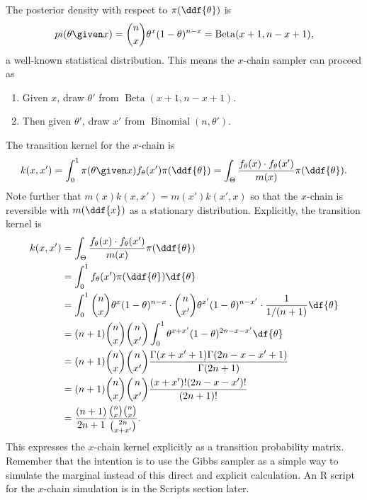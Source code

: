 \documentclass[12pt]{article}
\begin{document}
The posterior density with respect to \( \pi(\ddf{\theta}) \) is
\[
    \\
    pi(\theta \given x) = \binom{n}{x}\theta^x(1-\theta)^{n-x} =
    \operatorname{Beta}
    (x+1, n-x+1),
\] a well-known statistical distribution.  This means the \( x \)-chain
sampler can proceed as
\begin{enumerate}
    \item
        Given \( x \), draw \( \theta' \) from \(
        \operatorname{Beta}
        (x+1, n-x+1) \).
    \item
        Then given \( \theta' \), draw \( x' \) from \(
        \operatorname{Binomial}
        (n,\theta') \).
\end{enumerate}
The transition kernel for the \( x \)-chain is
\[
    k(x,x') = \int_0^1 \pi(\theta \given x) f_{\theta}(x') \pi(\ddf{\theta})
    = \int_{\Theta} \frac{f_{\theta}(x) \cdot f_{\theta}(x')}{m(x)} \pi(\ddf
    {\theta}).
\] Note further that \( m(x) k(x,x') = m(x') k(x',x) \) so that the \( x
\)-chain is reversible with \( m(\ddf{x}) \) as a stationary
distribution. Explicitly, the transition kernel is
\begin{align*}
    k(x,x') &= \int_{\Theta} \frac{f_{\theta}(x) \cdot f_{\theta}(x')}{m
              (x)} \pi(\ddf{\theta}) \\
            &= \int_0^1 f_{\theta}(x')\pi(\ddf{\theta})
    \df{\theta} \\
    &= \int_0^1 \binom{n}{x}\theta^x(1-\theta)^{n-x} \cdot \binom{n}{x'}\theta^
    {x'}(1-\theta)^{n-x'} \cdot \frac{1}{1/(n+1)} \df{\theta} \\
    &= (n+1) \binom{n}{x} \binom{n}{x'} \int_0^1 \theta^{x+x'}(1-\theta)^
    {2n-x-x'} \df{\theta} \\
    &= (n+1) \binom{n}{x} \binom{n}{x'} \frac{\Gamma(x+x'+1)\Gamma(2n-x-x'+1)}
    {\Gamma(2n+1)} \\
    &= (n+1) \binom{n}{x} \binom{n}{x'} \frac{(x+x')!  (2n-x-x')!}{(2n+1)!}
    \\
    &= \frac{(n+1)}{2n+1} \frac{\binom{n}{x} \binom{n}{x}}{\binom{2n}{x+x'}}.
\end{align*}
This expresses the \( x \)-chain kernel explicitly as a transition
probability matrix.  Remember that the intention is to use the Gibbs
sampler as a simple way to simulate the marginal instead of this direct
and explicit calculation.  An R script for the \( x \)-chain simulation
is in the Scripts section later.
\end{document}
